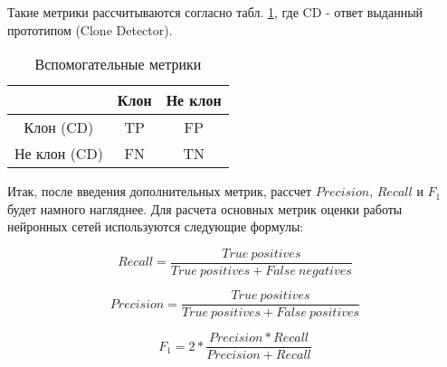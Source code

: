 Такие метрики рассчитываются согласно табл. \ref{truepos}, где CD - ответ выданный прототипом (Clone Detector).

\begin{table}[H]
\centering
\captionsetup{skip=5pt}
\caption{Вспомогательные метрики}
\label{truepos}
\begin{tabular}{c|c|c|}
\cline{2-3}
                                   & Клон & Не клон \\ \hline
\multicolumn{1}{|c|}{Клон (CD)}    & TP   & FP      \\ \hline
\multicolumn{1}{|c|}{Не клон (CD)} & FN   & TN      \\ \hline
\end{tabular}
\end{table}

Итак, после введения дополнительных метрик, рассчет \(Precision\), \(Recall\) и \(F_1\) будет намного нагляднее. Для расчета основных метрик оценки работы нейронных сетей используются следующие формулы:

\begin{equation}
\label{eq:recall}
Recall = \frac{True\ positives}{True\ positives + False\ negatives}
\end{equation}

\begin{equation}
\label{eq:precision}
Precision = \frac{True\ positives}{True\ positives + False\ positives}
\end{equation}

\begin{equation}
\label{eq:f1}
F_1 = 2*\frac{Precision * Recall}{Precision + Recall}
\end{equation}

